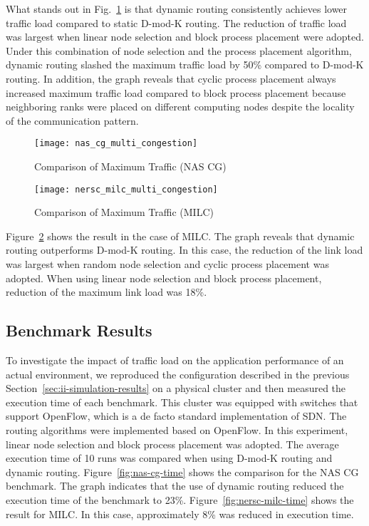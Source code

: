 What stands out in Fig.~\ref{fig:nas-cg-multi-congestion} is that
dynamic routing consistently achieves lower traffic load compared to
static \mbox{D-mod-K} routing. The reduction of traffic load was largest
when linear node selection and block process placement were adopted.
Under this combination of node selection and the process placement
algorithm, dynamic routing slashed the maximum traffic load by 50\%
compared to \mbox{D-mod-K} routing. In addition, the graph reveals that
cyclic process placement always increased maximum traffic load compared
to block process placement because neighboring ranks were placed on
different computing nodes despite the locality of the communication
pattern.

\begin{figure}
    \centering
    \texttt{[image: nas\_cg\_multi\_congestion]}
    \caption{Comparison of Maximum Traffic (NAS CG)}
    \label{fig:nas-cg-multi-congestion}
\end{figure}

\begin{figure}
    \centering
    \texttt{[image: nersc\_milc\_multi\_congestion]}
    \caption{Comparison of Maximum Traffic (MILC)}%
    \label{fig:nersc-milc-multi-congestion}
\end{figure}

Figure~\ref{fig:nersc-milc-multi-congestion} shows the result in the
case of MILC\@. The graph reveals that dynamic routing outperforms
\mbox{D-mod-K} routing. In this case, the reduction of the link load was
largest when random node selection and cyclic process placement was
adopted. When using linear node selection and block process placement,
reduction of the maximum link load was 18\%.

\subsection{Benchmark Results}

To investigate the impact of traffic load on the application performance
of an actual environment, we reproduced the configuration described in
the previous Section~\ref{sec:ii-simulation-results} on a physical cluster and
then measured the execution time of each benchmark. This cluster was
equipped with switches that support OpenFlow, which is a de facto
standard implementation of SDN\@. The routing algorithms were implemented
based on OpenFlow. In this experiment, linear node selection and block
process placement was adopted. The average execution time of 10 runs was
compared when using \mbox{D-mod-K} routing and dynamic routing.
Figure~\ref{fig:nas-cg-time} shows the comparison for the NAS CG
benchmark. The graph indicates that the use of dynamic routing reduced
the execution time of the benchmark to 23\%.
Figure~\ref{fig:nersc-milc-time} shows the result for MILC\@. In this
case, approximately 8\% was reduced in execution time.

